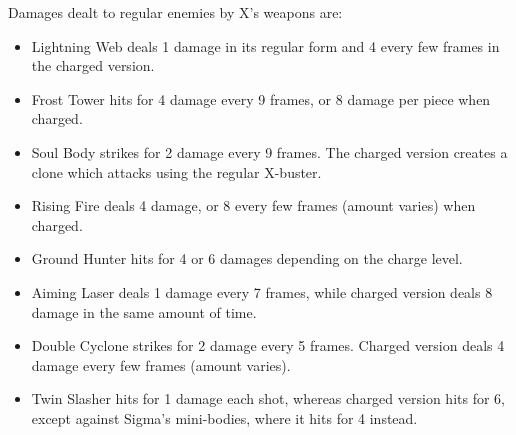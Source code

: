 Damages dealt to regular enemies by X's weapons are:
\begin{itemize}
	\item Lightning Web deals 1 damage in its regular form and 4 every few frames in the charged version.
	\item Frost Tower hits for 4 damage every 9 frames, or 8 damage per piece when charged.
	\item Soul Body strikes for 2 damage every 9 frames. The charged version creates a clone which attacks using the regular X-buster.
	\item Rising Fire deals 4 damage, or 8 every few frames (amount varies) when charged.
	\item Ground Hunter hits for 4 or 6 damages depending  on the charge level.
	\item Aiming Laser deals 1 damage every 7 frames, while charged version deals 8 damage in the same amount of time.
	\item Double Cyclone strikes for 2 damage every 5 frames. Charged version deals 4 damage every few frames (amount varies).
	\item Twin Slasher hits for 1 damage each shot, whereas charged version hits for 6, except against Sigma's mini-bodies, where it hits for 4 instead.
\end{itemize}

